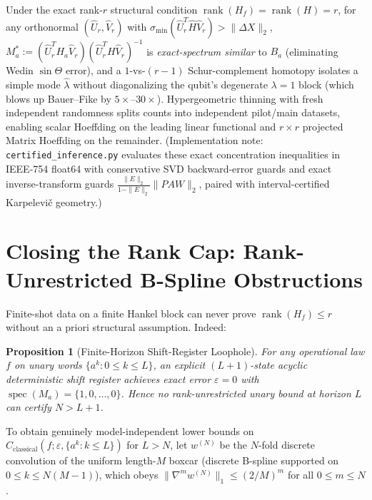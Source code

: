 \documentclass[11pt]{article}
\newtheorem{proposition}[theorem]{Proposition}
\theoremstyle{definition}
\newcommand{\eps}{\varepsilon}
\newcommand{\Spec}{\operatorname{spec}}
\begin{document}
Under the exact rank-$r$ structural condition $\operatorname{rank}(H_f)=\operatorname{rank}(H)=r$, for any orthonormal $(\hat{U}_r,\hat{V}_r)$ with $\sigma_{\min}(\hat{U}_r^T\hat{H}\hat{V}_r)>\|\Delta X\|_2$, $M_a^*:=(\hat{U}_r^T H_a\hat{V}_r)(\hat{U}_r^T H\hat{V}_r)^{-1}$ is \emph{exact-spectrum similar} to $B_a$ (eliminating Wedin $\sin\Theta$ error), and a $1$-vs-$(r-1)$ Schur-complement homotopy isolates a simple mode $\hat{\lambda}$ without diagonalizing the qubit's degenerate $\lambda=1$ block (which blows up Bauer--Fike by $5\times$--$30\times$). Hypergeometric thinning with fresh independent randomness splits counts into independent pilot/main datasets, enabling scalar Hoeffding on the leading linear functional and $r\times r$ projected Matrix Hoeffding on the remainder. (Implementation note: \texttt{certified\_inference.py} evaluates these exact concentration inequalities in IEEE-754 float64 with conservative SVD backward-error guards and exact inverse-transform guards $\frac{\|E\|_2}{1-\|E\|_2}\|PAW\|_2$, paired with interval-certified Karpelevi\v{c} geometry.)

\section{Closing the Rank Cap: Rank-Unrestricted B-Spline Obstructions}

Finite-shot data on a finite Hankel block can never prove $\operatorname{rank}(H_f)\le r$ without an a priori structural assumption. Indeed:

\begin{proposition}[Finite-Horizon Shift-Register Loophole]\label{prop:shift}
For any operational law $f$ on unary words $\{a^k:0\le k\le L\}$, an explicit $(L+1)$-state acyclic deterministic shift register achieves exact error $\eps=0$ with $\Spec(M_a)=\{1,0,\dots,0\}$. Hence no rank-unrestricted unary bound at horizon $L$ can certify $N>L+1$.
\end{proposition}

To obtain genuinely model-independent lower bounds on $C_{\mathrm{classical}}(f;\eps,\{a^k:k\le L\})$ for $L>N$, let $w^{(N)}$ be the $N$-fold discrete convolution of the uniform length-$M$ boxcar (discrete B-spline supported on $0\le k\le N(M-1)$), which obeys $\|\nabla^m w^{(N)}\|_1\le (2/M)^m$ for all $0\le m\le N$.
\end{document}

